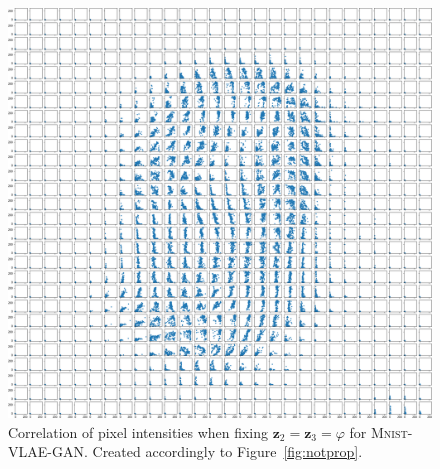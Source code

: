\begin{figure}[H]
    \centering
    \includegraphics[width=\textwidth]{images/notprop/mnist/vlae_gan/ccs_1_2_vlae_gan.png}
    \caption[\textsc{Mnist}-VLAE-GAN - Pixel Correlation - $\bm{z}_2$ vs. $\bm{z}_3$]{Correlation of pixel intensities when fixing $\bm{z}_2 = \bm{z}_3=\varphi$ for \textsc{Mnist}-\ac{VLAE}-\ac{GAN}. Created accordingly to Figure~\ref{fig:notprop}.}
\end{figure}